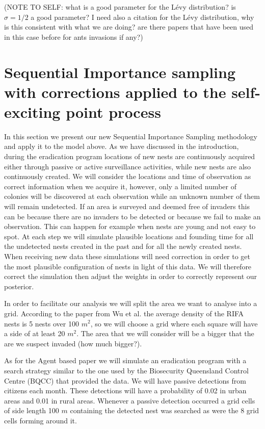 \documentclass[11pt,a4paper]{article}
\begin{document}
{{(NOTE TO SELF: what is a good parameter for the L\'evy distribution? is $\sigma = 1/2$ a good parameter? I need also a citation for the L\'evy distribution, why is this consistent with what we are doing? are there papers that have been used in this case before for ants invasions if any?)
}


{\color{red}
\section{Sequential Importance sampling with corrections applied to the self-exciting point process} \label{sec:SISMethod}

In this section we present our new Sequential Importance Sampling methodology and apply it to the model above. As we have discussed in the introduction, during the eradication program locations of new nests are continuously acquired either through passive or active surveillance activities, while new nests are also continuously created. We will consider the locations and time of observation as correct information when we acquire it, however, only a limited number of colonies will be discovered at each observation while an unknown number of them will remain undetected. If an area is surveyed and deemed free of invaders this can be because there are no invaders to be detected or because we fail to make an observation. This can happen for example when nests are young and not easy to spot. At each step we will simulate plausible locations and founding time for all the undetected nests created in the past and for all the newly created nests. When receiving new data these simulations will need correction in order to get the most plausible configuration of nests in light of this data. We will therefore correct the simulation then adjust the weights in order to correctly represent our posterior.

In order to facilitate our analysis we will split the area we want to analyse into a grid. According to the paper from Wu et al. \cite{Wu} the average density of the RIFA nests is 5 nests over 100 $m^2$, so we will choose a grid where each square will have a side of at least 20 $m^2$. The area that we will consider will be a bigger that the are we suspect invaded (how much bigger?).

As for the Agent based paper \cite{Keith} we will simulate an eradication program with a search strategy similar to the one used by the Biosecurity Queensland Control Centre (BQCC) that provided the data. We will have passive detections from citizens each month. These detections will have a probability of 0.02 in urban areas and 0.01 in rural areas. Whenever a passive detection occurred a grid cells of side length 100 $m$ containing the detected nest was searched as were the 8 grid cells forming around it.

}}
\end{document}
